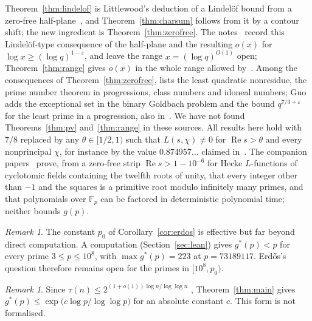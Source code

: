 \documentclass[12pt]{amsart}
\theoremstyle{remark}
\newtheorem{remark}[theorem]{Remark}
\renewcommand{\Re}{\operatorname{Re}}
\begin{document}
Theorem~\ref{thm:lindelof} is Littlewood's deduction of a Lindel\"of bound from a zero-free
half-plane~\cite[\S14.2]{Tit86}, and Theorem~\ref{thm:charsum} follows from it by a contour shift;
the new ingredient is Theorem~\ref{thm:zerofree}. The notes~\cite[Hunt~125, \S5]{ZL26} record
this Lindel\"of-type consequence of the half-plane and the resulting $o(x)$ for $\log x\ge(\log
q)^{1-\varepsilon}$, and leave the range $x=(\log q)^{O(1)}$ open; Theorem~\ref{thm:range} gives
$o(x)$ in the whole range allowed by~\cite[Thm.~3]{GS01}. Among the consequences of Theorem~\ref{thm:zerofree}, \cite{OAI26} lists the
least quadratic nonresidue, the prime number theorem in progressions, class numbers and idoneal
numbers; Guo~\cite[\S6]{Guo26} adds the exceptional set in the binary Goldbach problem and the
bound $q^{7/3+\varepsilon}$ for the least prime in a progression, also in~\cite[Hunt~123]{ZL26}.
We have not found Theorems~\ref{thm:pv} and~\ref{thm:range} in these sources. All results here hold with $7/8$ replaced by any
$\theta\in[1/2,1)$ such that $L(s,\chi)\ne0$ for $\Re s>\theta$ and every nonprincipal $\chi$, for
instance by the value $0.874957\ldots$ claimed in~\cite{Liu26}. The companion
papers~\cite{OAI26b,OAI26c} prove, from a zero-free strip $\Re s>1-10^{-6}$ for Hecke
$L$-functions of cyclotomic fields containing the twelfth roots of unity, that every integer other
than $-1$ and the squares is a primitive root modulo infinitely many primes, and that polynomials
over $\mathbb F_p$ can be factored in deterministic polynomial time; neither bounds $g(p)$.

\begin{remark}\label{rem:p0}
The constant $p_0$ of Corollary~\ref{cor:erdos} is effective but far beyond direct computation.
A computation (Section~\ref{sec:lean}) gives $g^*(p)<p$ for every prime $3\le p\le10^8$, with
$\max g^*(p)=223$ at $p=73189117$. Erd\H{o}s's question therefore remains open for the primes in
$[10^8,p_0)$.
\end{remark}

\begin{remark}\label{rem:wigert}
Since $\tau(n)\le 2^{(1+o(1))\log n/\log\log n}$ \cite[Thm.~317]{HW}, Theorem~\ref{thm:main}
gives $g^*(p)\le\exp\bigl(c\log p/\log\log p\bigr)$ for an absolute constant $c$. This form is not
formalised.
\end{remark}
\end{document}
